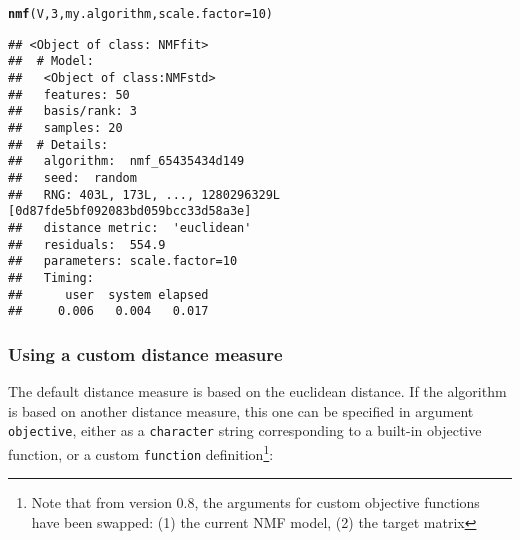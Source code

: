 \documentclass[a4paper]{article}\usepackage[]{graphicx}\usepackage[]{color}
\makeatletter
\newcommand{\hlnum}[1]{\textcolor[rgb]{0.686,0.059,0.569}{#1}}%
\newcommand{\hlstd}[1]{\textcolor[rgb]{0.345,0.345,0.345}{#1}}%
\newcommand{\hlkwc}[1]{\textcolor[rgb]{0.333,0.667,0.333}{#1}}%
\newcommand{\hlkwd}[1]{\textcolor[rgb]{0.737,0.353,0.396}{\textbf{#1}}}%
\newenvironment{kframe}{%
 \def\at@end@of@kframe{}%
 \ifinner\ifhmode%
  \def\at@end@of@kframe{\end{minipage}}%
  \begin{minipage}{\columnwidth}%
 \fi\fi%
 \def\FrameCommand##1{\hskip\@totalleftmargin \hskip-\fboxsep
 \colorbox{shadecolor}{##1}\hskip-\fboxsep
     \hskip-\linewidth \hskip-\@totalleftmargin \hskip\columnwidth}%
 \MakeFramed {\advance\hsize-\width
   \@totalleftmargin\z@ \linewidth\hsize
   \@setminipage}}%
 {\par\unskip\endMakeFramed%
 \at@end@of@kframe}
\newenvironment{knitrout}{}{} %
\let\code=\texttt
\makeatother
\begin{document}
\begin{knitrout}
\color{fgcolor}\begin{kframe}
\begin{alltt}
\hlkwd{nmf}\hlstd{(V,} \hlnum{3}\hlstd{, my.algorithm,} \hlkwc{scale.factor} \hlstd{=} \hlnum{10}\hlstd{)}
\end{alltt}
\begin{verbatim}
## <Object of class: NMFfit>
##  # Model:
##   <Object of class:NMFstd>
##   features: 50 
##   basis/rank: 3 
##   samples: 20 
##  # Details:
##   algorithm:  nmf_65435434d149 
##   seed:  random 
##   RNG: 403L, 173L, ..., 1280296329L [0d87fde5bf092083bd059bcc33d58a3e]
##   distance metric:  'euclidean' 
##   residuals:  554.9 
##   parameters: scale.factor=10 
##   Timing:
##      user  system elapsed 
##     0.006   0.004   0.017
\end{verbatim}
\end{kframe}
\end{knitrout}


\subsubsection{Using a custom distance measure}
The default distance measure is based on the euclidean distance. 
If the algorithm is based on another distance measure, this one can be specified in argument \code{objective}, either as a \code{character} string corresponding to a built-in objective function, or a custom \code{function} definition\footnote{Note that from version 0.8, the arguments for custom objective functions have been swapped: (1) the current NMF model, (2) the target matrix}:
\end{document}
